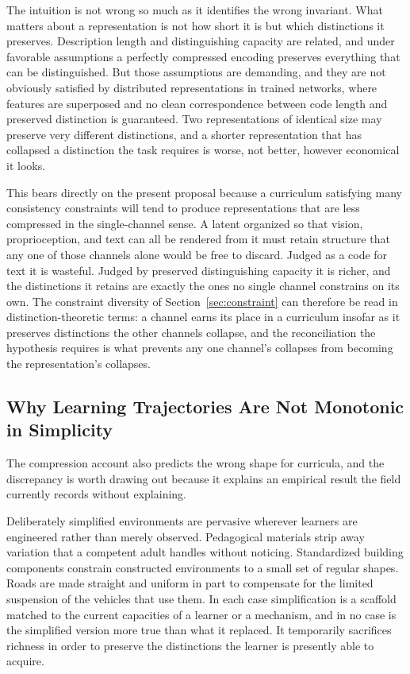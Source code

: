 \documentclass[11pt]{article}
\begin{document}
The intuition is not wrong so much as it identifies the wrong invariant. What matters about a representation is not how short it is but which distinctions it preserves. Description length and distinguishing capacity are related, and under favorable assumptions a perfectly compressed encoding preserves everything that can be distinguished. But those assumptions are demanding, and they are not obviously satisfied by distributed representations in trained networks, where features are superposed and no clean correspondence between code length and preserved distinction is guaranteed. Two representations of identical size may preserve very different distinctions, and a shorter representation that has collapsed a distinction the task requires is worse, not better, however economical it looks.

This bears directly on the present proposal because a curriculum satisfying many consistency constraints will tend to produce representations that are less compressed in the single-channel sense. A latent organized so that vision, proprioception, and text can all be rendered from it must retain structure that any one of those channels alone would be free to discard. Judged as a code for text it is wasteful. Judged by preserved distinguishing capacity it is richer, and the distinctions it retains are exactly the ones no single channel constrains on its own. The constraint diversity of Section~\ref{sec:constraint} can therefore be read in distinction-theoretic terms: a channel earns its place in a curriculum insofar as it preserves distinctions the other channels collapse, and the reconciliation the hypothesis requires is what prevents any one channel's collapses from becoming the representation's collapses.

\subsection{Why Learning Trajectories Are Not Monotonic in Simplicity}

The compression account also predicts the wrong shape for curricula, and the discrepancy is worth drawing out because it explains an empirical result the field currently records without explaining.

Deliberately simplified environments are pervasive wherever learners are engineered rather than merely observed. Pedagogical materials strip away variation that a competent adult handles without noticing. Standardized building components constrain constructed environments to a small set of regular shapes. Roads are made straight and uniform in part to compensate for the limited suspension of the vehicles that use them. In each case simplification is a scaffold matched to the current capacities of a learner or a mechanism, and in no case is the simplified version more true than what it replaced. It temporarily sacrifices richness in order to preserve the distinctions the learner is presently able to acquire.
\end{document}
